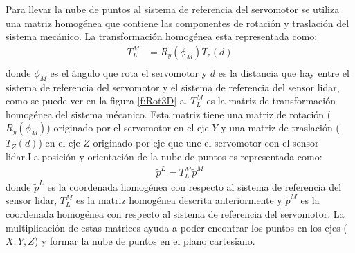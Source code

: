 Para llevar la nube de puntos al sistema de referencia del servomotor se utiliza una matriz 
homogénea que contiene las componentes de rotación y traslación del sistema mecánico. La transformación
homogénea esta representada como:
\begin{align*}
	T_{L}^{M} &= R_{y}(\phi_{M}) T_{z}(d) \\
\end{align*}
donde $\phi_{M}$ es el ángulo que rota el servomotor y $d$ es la distancia que hay entre el sistema de 
referencia del servomotor y el sistema de referencia del sensor lidar, como se puede ver en la 
figura \ref{f:Rot3D} a. $T_{L}^{M}$ es la matriz de transformación homogénea del sistema mécanico. Esta 
matriz tiene una matriz de rotación ($R_{y}(\phi_{M})$) originado por el servomotor en el eje $Y$ y una
matriz de traslación ($T_{Z}(d)$) en el eje $Z$ originado por eje que une el servomotor con el sensor 
lidar.La posición y orientación de la nube de puntos es representada como:
\begin{align}
	\tilde{p}^{L} = T_{L}^{M} \tilde{p}^{M}
	\label{eqn:MatrizHomogenea}
\end{align}
donde $\tilde{p}^{L}$ es la coordenada homogénea con respecto al sistema de referencia del sensor
lidar, $T_{L}^{M}$ es la matriz homogénea descrita anteriormente y $\tilde{p}^{M}$ es la coordenada 
homogénea con respecto al sistema de referencia del servomotor. La multiplicación de estas matrices
ayuda a poder encontrar los puntos en los ejes ($X,Y,Z$) y formar la nube de puntos en el plano 
cartesiano.

